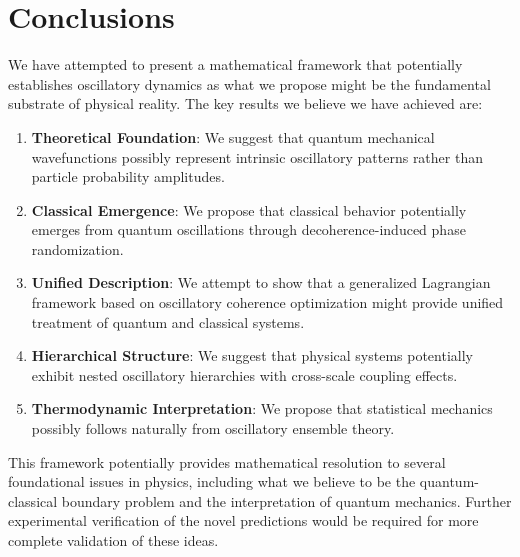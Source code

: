 \documentclass[11pt]{article}
\theoremstyle{remark}
\begin{document}
\section{Conclusions}

We have attempted to present a mathematical framework that potentially establishes oscillatory dynamics as what we propose might be the fundamental substrate of physical reality. The key results we believe we have achieved are:

\begin{enumerate}
\item \textbf{Theoretical Foundation}: We suggest that quantum mechanical wavefunctions possibly represent intrinsic oscillatory patterns rather than particle probability amplitudes.

\item \textbf{Classical Emergence}: We propose that classical behavior potentially emerges from quantum oscillations through decoherence-induced phase randomization.

\item \textbf{Unified Description}: We attempt to show that a generalized Lagrangian framework based on oscillatory coherence optimization might provide unified treatment of quantum and classical systems.

\item \textbf{Hierarchical Structure}: We suggest that physical systems potentially exhibit nested oscillatory hierarchies with cross-scale coupling effects.

\item \textbf{Thermodynamic Interpretation}: We propose that statistical mechanics possibly follows naturally from oscillatory ensemble theory.
\end{enumerate}

This framework potentially provides mathematical resolution to several foundational issues in physics, including what we believe to be the quantum-classical boundary problem and the interpretation of quantum mechanics. Further experimental verification of the novel predictions would be required for more complete validation of these ideas.
\end{document}
